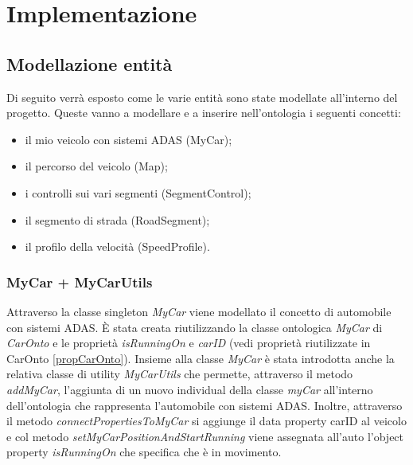 \chapter{Implementazione}

\section{Modellazione entit\`a}
Di seguito verr\`a esposto come le varie entit\`a sono state modellate all'interno del progetto.
Queste vanno a modellare e a inserire nell'ontologia i seguenti concetti:
\begin{itemize}
\item il mio veicolo con sistemi ADAS (MyCar);
\item il percorso del veicolo (Map);
\item i controlli sui vari segmenti (SegmentControl);
\item il segmento di strada (RoadSegment);
\item il profilo della velocit\`a (SpeedProfile).
\end{itemize}
\subsection{MyCar + MyCarUtils}
Attraverso la classe singleton \textit{MyCar} viene modellato il concetto di automobile con sistemi ADAS. \`E stata creata riutilizzando la classe ontologica \textit{MyCar} di \textit{CarOnto} e le propriet\`a \textit{isRunningOn} e \textit{carID} (vedi propriet\`a riutilizzate in CarOnto \ref{propCarOnto}).
Insieme alla classe \textit{MyCar} \`e stata introdotta anche la relativa classe di utility \textit{MyCarUtils} che permette, attraverso il metodo \textit{addMyCar}, l'aggiunta di un nuovo individual della classe \textit{myCar} all'interno dell'ontologia che rappresenta l'automobile con sistemi ADAS.
Inoltre, attraverso il metodo \textit{connectPropertiesToMyCar} si aggiunge il data property carID al veicolo e col metodo \textit{setMyCarPositionAndStartRunning} viene assegnata all'auto l'object property \textit{isRunningOn} che specifica che \`e in movimento.

